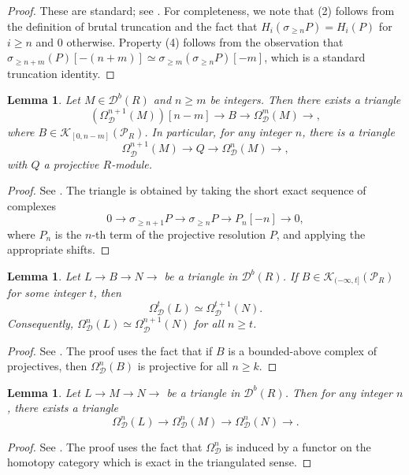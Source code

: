 \documentclass[12pt,a4paper,reqno]{amsart}
\theoremstyle{plain}
\newtheorem{lemma}[theorem]{Lemma}
\theoremstyle{definition}
\theoremstyle{remark}
\newcommand{\Db}{\mathcal{D}^b}
\newcommand{\K}{\mathcal{K}}
\newcommand{\PR}{\mathcal{P}_R}
\newcommand{\syz}{\Omega_{\mathcal{D}}}
\begin{document}
\begin{proof}
These are standard; see \cite[Lemma 3.3]{Wei}. For completeness, we note that (2) follows from the definition of brutal truncation and the fact that $H_i(\sigma_{\geq n}P) = H_i(P)$ for $i \ge n$ and $0$ otherwise. Property (4) follows from the observation that $\sigma_{\geq n+m}(P)[-(n+m)] \simeq \sigma_{\geq m}(\sigma_{\geq n}P)[-m]$, which is a standard truncation identity.
\end{proof}

\begin{lemma}\label{lem:syzygy-triangle}
Let $M \in \Db(R)$ and $n \geq m$ be integers. Then there exists a triangle
\[
(\syz^{n+1}(M))[n-m] \longrightarrow B \longrightarrow \syz^m(M) \longrightarrow,
\]
where $B \in \K_{[0,n-m]}(\PR)$. In particular, for any integer $n$, there is a triangle
\[
\syz^{n+1}(M) \longrightarrow Q \longrightarrow \syz^n(M) \longrightarrow,
\]
with $Q$ a projective $R$-module.
\end{lemma}

\begin{proof}
See \cite[Lemma 3.4]{Wei}. The triangle is obtained by taking the short exact sequence of complexes
\[
0 \to \sigma_{\geq n+1}P \to \sigma_{\geq n}P \to P_n[-n] \to 0,
\]
where $P_n$ is the $n$-th term of the projective resolution $P$, and applying the appropriate shifts.
\end{proof}

\begin{lemma}\label{lem:syzygy-comparison}
Let $L \to B \to N \to$ be a triangle in $\Db(R)$. If $B \in \K_{(-\infty,t]}(\PR)$ for some integer $t$, then
\[
\syz^t(L) \simeq \syz^{t+1}(N).
\]
Consequently, $\syz^n(L) \simeq \syz^{n+1}(N)$ for all $n \geq t$.
\end{lemma}

\begin{proof}
See \cite[Lemma 3.7]{Wei}. The proof uses the fact that if $B$ is a bounded-above complex of projectives, then $\syz^n(B)$ is projective for all $n \ge k$.
\end{proof}

\begin{lemma}\label{lem:syzygy-preserve}
Let $L \to M \to N \to$ be a triangle in $\Db(R)$. Then for any integer $n$, there exists a triangle
\[
\syz^n(L) \longrightarrow \syz^n(M) \longrightarrow \syz^n(N) \longrightarrow.
\]
\end{lemma}

\begin{proof}
See \cite[Proposition 3.8]{Wei}. The proof uses the fact that $\syz^n$ is induced by a functor on the homotopy category which is exact in the triangulated sense.
\end{proof}
\end{document}
